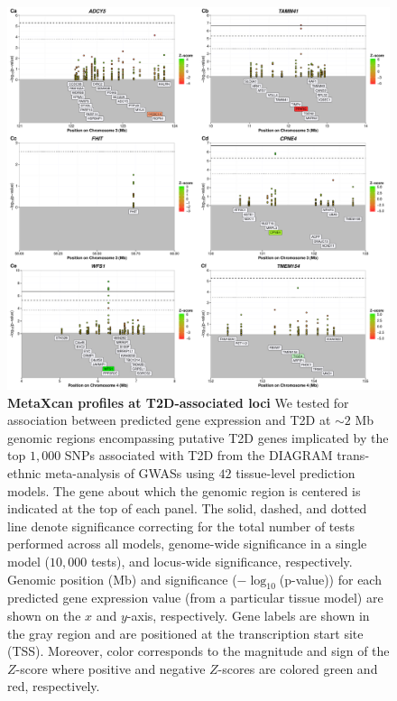 \documentclass[10pt]{article}
\begin{document}
\begin{figure}
\ContinuedFloat
\includegraphics[width=\textwidth]{sup_fig1_part3_locusArray.pdf}
	\caption{\textbf{MetaXcan profiles at T2D-associated loci} We tested for association between predicted gene expression and T2D at $\sim2$ Mb genomic regions encompassing putative T2D genes implicated by the top $1,000$ SNPs associated with T2D from the DIAGRAM trans-ethnic meta-analysis of GWASs using $42$ tissue-level prediction models. The gene about which the genomic region is centered is indicated at the top of each panel. The solid, dashed, and dotted line denote significance correcting for the total number of tests performed across all models, genome-wide significance in a single model ($10,000$ tests), and locus-wide significance, respectively. Genomic position (Mb) and significance ($-\log_{10}$(p-value)) for each predicted gene expression value (from a particular tissue model) are shown on the $x$ and $y$-axis, respectively. Gene labels are shown in the gray region and are positioned at the transcription start site (TSS). Moreover, color corresponds to the magnitude and sign of the $Z$-score where positive and negative $Z$-scores are colored green and red, respectively.} 
    \label{fig:supp.locus_array_fig1_part3}
\end{figure}
\end{document}
